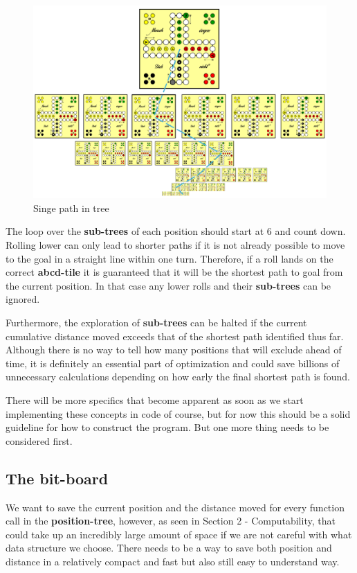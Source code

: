 \documentclass[12pt]{article}
\begin{document}
\begin{figure}[htbp]
    \centering
    \includegraphics[width=1\textwidth]{images/Figure5}
    \caption{Singe path in tree}
    \label{fig:pathintree}
\end{figure}

The loop over the \textbf{sub-trees} of each position should start at 6 and count down. Rolling lower can only lead to shorter paths if it is not already possible to move to the goal in a straight line within one turn. Therefore, if a roll lands on the correct \textbf{abcd-tile} it is guaranteed that it will be the shortest path to goal from the current position. In that case any lower rolls and their \textbf{sub-trees} can be ignored.

Furthermore, the exploration of \textbf{sub-trees} can be halted if the current cumulative distance moved exceeds that of the shortest path identified thus far. Although there is no way to tell how many positions that will exclude ahead of time, it is definitely an essential part of optimization and could save billions of unnecessary calculations depending on how early the final shortest path is found.

There will be more specifics that become apparent as soon as we start implementing these concepts in code of course, but for now this should be a solid guideline for how to construct the program. But one more thing needs to be considered first.

\subsection{The bit-board}
We want to save the current position and the distance moved for every function call in the \textbf{position-tree}, however, as seen in Section 2 - Computability, that could take up an incredibly large amount of space if we are not careful with what data structure we choose.
There needs to be a way to save both position and distance in a relatively compact and fast but also still easy to understand way.
\end{document}
